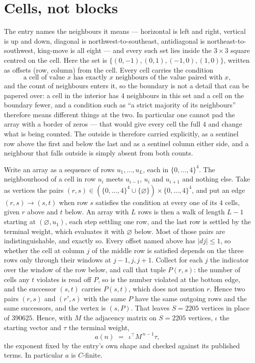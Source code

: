 \documentclass[11pt,a4paper]{article}
\theoremstyle{plain}
\theoremstyle{definition}
\begin{document}
\section{Cells, not blocks}

The entry names the neighbours it means --- horizontal is left and right, vertical is up and
down, diagonal is northwest-to-southeast, antidiagonal is northeast-to-southwest, king-move is
all eight --- and every such set lies inside the $3\times3$ square centred on the cell. Here
the set is $\{(0,-1), (0,1), (-1,0), (1,0)\}$, written as offsets (row, column) from the cell. Every cell carries
the condition
\[
\text{a cell of value }x\text{ has exactly }x\text{ neighbours of the value paired with }x,
\]
and the count of neighbours enters it, so the boundary is not a detail that can be papered
over: a cell in the interior has $4$ neighbours in this set and a cell on the boundary
fewer, and a condition such as ``a strict majority of its neighbours'' therefore means
different things at the two. In particular one cannot pad the array with a border of zeros ---
that would give every cell the full $4$ and change what is being counted. The outside is
therefore carried
explicitly, as a sentinel row above the first and below the last and as a sentinel column
either side, and a neighbour that falls outside is simply absent from both counts.

Write an array as a sequence of rows $u_1,\dots,u_L$, each in
$\{0,\dots,4\}^{4}$. The neighbourhood of a cell in row $u_i$ meets $u_{i-1}$,
$u_i$ and $u_{i+1}$ and nothing else. Take as vertices the pairs
$(r,s)\in(\{0,\dots,4\}^{4}\cup\{\varnothing\})\times\{0,\dots,4\}^{4}$,
and put an edge $(r,s)\to(s,t)$ when row $s$ satisfies the condition at every one of its
$4$ cells, given $r$ above and $t$ below. An array with $L$ rows is then a walk of length
$L-1$ starting at $(\varnothing,u_1)$, each step settling one row, and the last row is
settled by the terminal weight, which evaluates it with $\varnothing$ below. Most of those pairs are indistinguishable, and exactly so. Every offset named above has $|dj|\le 1$, so whether the cell at column $j$ of the middle row is satisfied depends on the three rows only through their windows at $j-1,j,j+1$. Collect for each $j$ the indicator over the window of the row below, and call that tuple $P(r,s)$: the number of cells any $t$ violates is read off $P$, so is the number violated at the bottom edge, and the successor $(s,t)$ carries $P(s,t)$, which does not mention $r$. Hence two pairs $(r,s)$ and $(r',s)$ with the same $P$ have the same outgoing rows and the same successors, and the vertex is $(s,P)$. That leaves $S=2205$ vertices in place of $390625$. Hence,
with $M$ the adjacency matrix on $S=2205$ vertices, $\iota$ the starting vector and $\tau$ the
terminal weight,
\[
a(n)\;=\;\,\iota^{\!\top}M^{\,n-1}\tau ,
\]
the exponent fixed by the entry's own shape and checked against its published terms. In
particular $a$ is $C$-finite.
\end{document}

